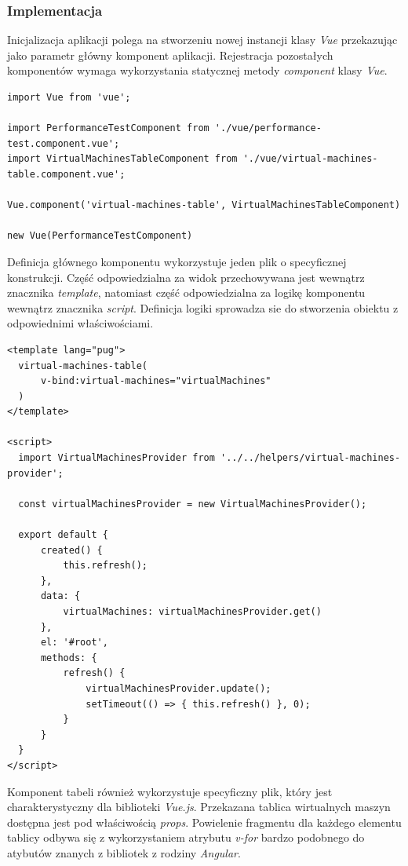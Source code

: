 \documentclass[polish, twoside, 12pt]{mwart}
\begin{document}
\subsubsection{Implementacja}

Inicjalizacja aplikacji polega na stworzeniu nowej instancji klasy \emph{Vue} przekazując jako parametr główny komponent aplikacji. Rejestracja pozostałych komponentów wymaga wykorzystania statycznej metody \emph{component} klasy \emph{Vue}.

\begin{lstlisting}[caption=Inicjalizacja głównego komponentu]
import Vue from 'vue';

import PerformanceTestComponent from './vue/performance-test.component.vue';
import VirtualMachinesTableComponent from './vue/virtual-machines-table.component.vue';

Vue.component('virtual-machines-table', VirtualMachinesTableComponent)

new Vue(PerformanceTestComponent)
\end{lstlisting}

Definicja głównego komponentu wykorzystuje jeden plik o specyficznej konstrukcji. Część odpowiedzialna za widok przechowywana jest wewnątrz znacznika \emph{template}, natomiast część odpowiedzialna za logikę komponentu wewnątrz znacznika \emph{script}. Definicja logiki sprowadza sie do stworzenia obiektu z odpowiednimi właściwościami.

\begin{lstlisting}[caption=Główny komponent]
<template lang="pug">
  virtual-machines-table(
      v-bind:virtual-machines="virtualMachines"
  )
</template>

<script>
  import VirtualMachinesProvider from '../../helpers/virtual-machines-provider';

  const virtualMachinesProvider = new VirtualMachinesProvider();

  export default {
      created() {
          this.refresh();
      },
      data: {
          virtualMachines: virtualMachinesProvider.get()
      },
      el: '#root',
      methods: {
          refresh() {
              virtualMachinesProvider.update();
              setTimeout(() => { this.refresh() }, 0);
          }
      }
  }
</script>
\end{lstlisting}

Komponent tabeli również wykorzystuje specyficzny plik, który jest charakterystyczny dla biblioteki \emph{Vue.js}. Przekazana tablica wirtualnych maszyn dostępna jest pod właściwością \emph{props}. Powielenie fragmentu dla każdego elementu tablicy odbywa się z wykorzystaniem atrybutu \emph{v-for} bardzo podobnego do atybutów znanych z bibliotek z rodziny \emph{Angular}.
\end{document}
